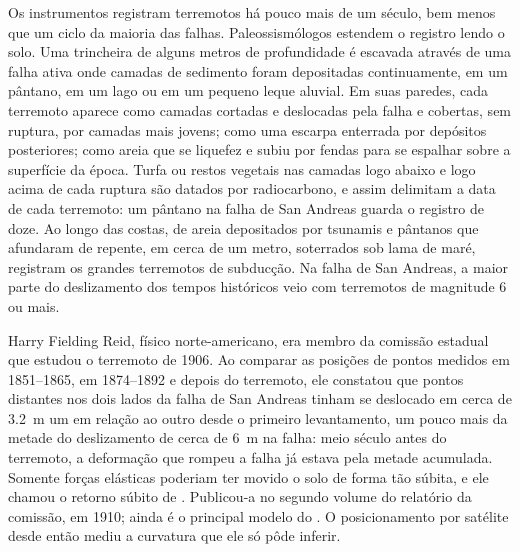\begin{inthefield}
Os instrumentos registram terremotos há pouco mais de um século, bem menos que um ciclo da maioria das falhas. Paleossismólogos estendem o registro lendo o solo. Uma trincheira de alguns metros de profundidade é escavada através de uma falha ativa onde camadas de sedimento foram depositadas continuamente, em um pântano, em um lago ou em um pequeno leque aluvial. Em suas paredes, cada terremoto aparece como camadas cortadas e deslocadas pela falha e cobertas, sem ruptura, por camadas mais jovens; como uma escarpa enterrada por depósitos posteriores; como areia que se liquefez e subiu por fendas para se espalhar sobre a superfície da época. Turfa ou restos vegetais nas camadas logo abaixo e logo acima de cada ruptura são datados por radiocarbono, e assim delimitam a data de cada terremoto: um pântano na falha de San Andreas guarda o registro de doze.
Ao longo das costas,  de areia depositados por tsunamis e pântanos que afundaram de repente, em cerca de um metro, soterrados sob lama de maré, registram os grandes terremotos de subducção. Na falha de San Andreas, a maior parte do deslizamento dos tempos históricos veio com terremotos de magnitude 6 ou mais.
\end{inthefield}

\begin{history}
Harry Fielding Reid, físico norte-americano, era membro da comissão estadual que estudou o terremoto de 1906. Ao comparar as posições de pontos medidos em 1851--1865, em 1874--1892 e depois do terremoto, ele constatou que pontos distantes nos dois lados da falha de San Andreas tinham se deslocado em cerca de \qty{3.2}{m} um em relação ao outro desde o primeiro levantamento, um pouco mais da metade do deslizamento de cerca de \qty{6}{m} na falha: meio século antes do terremoto, a deformação que rompeu a falha já estava pela metade acumulada. Somente forças elásticas poderiam ter movido o solo de forma tão súbita, e ele chamou o retorno súbito de . Publicou-a no segundo volume do relatório da comissão, em 1910; ainda é o principal modelo do . O posicionamento por satélite desde então mediu a curvatura que ele só pôde inferir.
\end{history}

